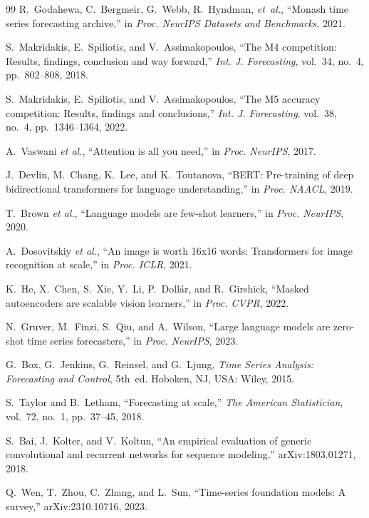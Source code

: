 \documentclass[journal]{IEEEtran}
\begin{document}
\begin{thebibliography}{99}
R.~Godahewa, C.~Bergmeir, G.~Webb, R.~Hyndman, \emph{et~al.},
``Monash time series forecasting archive,''
in \emph{Proc. NeurIPS Datasets and Benchmarks}, 2021.

S.~Makridakis, E.~Spiliotis, and V.~Assimakopoulos,
``The M4 competition: Results, findings, conclusion and way forward,''
\emph{Int. J. Forecasting}, vol.~34, no.~4, pp.~802--808, 2018.

S.~Makridakis, E.~Spiliotis, and V.~Assimakopoulos,
``The M5 accuracy competition: Results, findings and conclusions,''
\emph{Int. J. Forecasting}, vol.~38, no.~4, pp.~1346--1364, 2022.

A.~Vaswani \emph{et al.},
``Attention is all you need,''
in \emph{Proc. NeurIPS}, 2017.

J.~Devlin, M.~Chang, K.~Lee, and K.~Toutanova,
``BERT: Pre-training of deep bidirectional transformers for language understanding,''
in \emph{Proc. NAACL}, 2019.

T.~Brown \emph{et al.},
``Language models are few-shot learners,''
in \emph{Proc. NeurIPS}, 2020.

A.~Dosovitskiy \emph{et al.},
``An image is worth 16x16 words: Transformers for image recognition at scale,''
in \emph{Proc. ICLR}, 2021.

K.~He, X.~Chen, S.~Xie, Y.~Li, P.~Doll\'ar, and R.~Girshick,
``Masked autoencoders are scalable vision learners,''
in \emph{Proc. CVPR}, 2022.

N.~Gruver, M.~Finzi, S.~Qiu, and A.~Wilson,
``Large language models are zero-shot time series forecasters,''
in \emph{Proc. NeurIPS}, 2023.

G.~Box, G.~Jenkins, G.~Reinsel, and G.~Ljung,
\emph{Time Series Analysis: Forecasting and Control}, 5th~ed.
Hoboken, NJ, USA: Wiley, 2015.

S.~Taylor and B.~Letham,
``Forecasting at scale,''
\emph{The American Statistician}, vol.~72, no.~1, pp.~37--45, 2018.

S.~Bai, J.~Kolter, and V.~Koltun,
``An empirical evaluation of generic convolutional and recurrent networks for sequence modeling,''
arXiv:1803.01271, 2018.

Q.~Wen, T.~Zhou, C.~Zhang, and L.~Sun,
``Time-series foundation models: A survey,''
arXiv:2310.10716, 2023.


\end{thebibliography}
\end{document}
